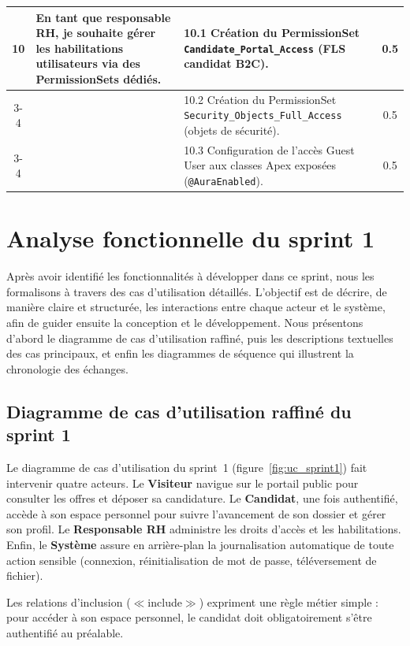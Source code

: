 \begin{longtable}{|c|p{5.5cm}|p{6cm}|c|}
\hline

\multirow{3}{*}{\textbf{10}} & \multirow{3}{5.5cm}{En tant que responsable RH, je souhaite gérer les habilitations utilisateurs via des PermissionSets dédiés.} & 10.1 Création du PermissionSet \texttt{Candidate\_Portal\_Access} (FLS candidat B2C). & 0.5 \\
\cline{3-4}
& & 10.2 Création du PermissionSet \texttt{Security\_Objects\_Full\_Access} (objets de sécurité). & 0.5 \\
\cline{3-4}
& & 10.3 Configuration de l'accès Guest User aux classes Apex exposées (\texttt{@AuraEnabled}). & 0.5 \\

\hline
\end{longtable}

\section{Analyse fonctionnelle du sprint 1}

Après avoir identifié les fonctionnalités à développer dans ce sprint, nous les formalisons à travers des cas d'utilisation détaillés. L'objectif est de décrire, de manière claire et structurée, les interactions entre chaque acteur et le système, afin de guider ensuite la conception et le développement. Nous présentons d'abord le diagramme de cas d'utilisation raffiné, puis les descriptions textuelles des cas principaux, et enfin les diagrammes de séquence qui illustrent la chronologie des échanges.

\subsection{Diagramme de cas d'utilisation raffiné du sprint 1}

Le diagramme de cas d'utilisation du sprint~1 (figure~\ref{fig:uc_sprint1}) fait intervenir quatre acteurs. Le \textbf{Visiteur} navigue sur le portail public pour consulter les offres et déposer sa candidature. Le \textbf{Candidat}, une fois authentifié, accède à son espace personnel pour suivre l'avancement de son dossier et gérer son profil. Le \textbf{Responsable RH} administre les droits d'accès et les habilitations. Enfin, le \textbf{Système} assure en arrière-plan la journalisation automatique de toute action sensible (connexion, réinitialisation de mot de passe, téléversement de fichier).

\medskip

Les relations d'inclusion ($\ll$include$\gg$) expriment une règle métier simple : pour accéder à son espace personnel, le candidat doit obligatoirement s'être authentifié au préalable.

